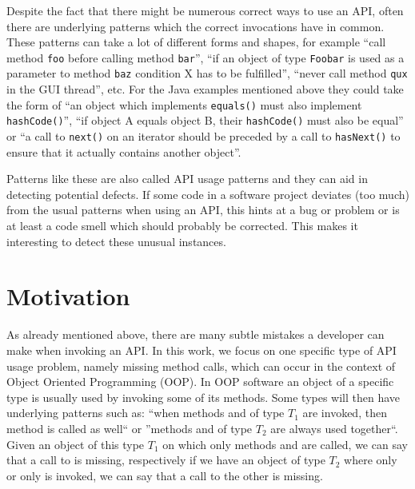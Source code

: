 Despite the fact that there might be numerous correct ways to use an API, often there are underlying patterns which the correct invocations have in common.
These patterns can take a lot of different forms and shapes, for example ``call method \texttt{foo} before calling method \texttt{bar}'', ``if an object of type \texttt{Foobar} is used as a parameter to method \texttt{baz} condition X has to be fulfilled'', ``never call method \texttt{qux} in the GUI thread'', etc.
For the Java examples mentioned above they could take the form of ``an object which implements \texttt{equals()} must also implement \texttt{hashCode()}'', ``if object A equals object B, their \texttt{hashCode()} must also be equal'' or ``a call to \texttt{next()} on an iterator should be preceded by a call to \texttt{hasNext()} to ensure that it actually contains another object''.

Patterns like these are also called API usage patterns \cite{robillard2013automated} and they can aid in detecting potential defects.
If some code in a software project deviates (too much) from the usual patterns when using an API, this hints at a bug or problem or is at least a code smell which should probably be corrected.
This makes it interesting to detect these unusual instances.

\section{Motivation}

As already mentioned above, there are many subtle mistakes a developer can make when invoking an API.
In this work, we focus on one specific type of API usage problem, namely missing method calls, which can occur in the context of Object Oriented Programming (OOP).
In OOP software an object of a specific type is usually used by invoking some of its methods.
Some types will then have underlying patterns such as: ``when methods  and  of type $T_1$ are invoked, then method  is called as well`` or ''methods  and  of type $T_2$ are always used together``.
Given an object of this type $T_1$ on which only methods  and  are called, we can say that a call to  is missing, respectively if we have an object of type $T_2$ where only  or only  is invoked, we can say that a call to the other is missing.

